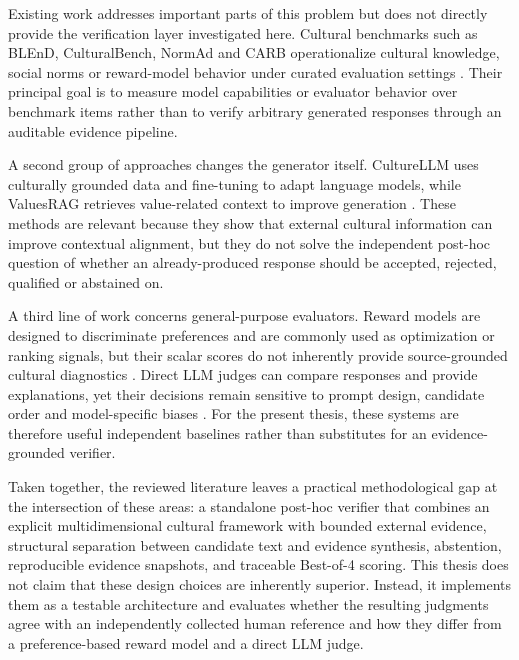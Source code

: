 Existing work addresses important parts of this problem but does not directly provide the verification layer investigated here. Cultural benchmarks such as BLEnD, CulturalBench, NormAd and CARB operationalize cultural knowledge, social norms or reward-model behavior under curated evaluation settings \parencite{myung2024blend,chiu2025culturalbench,rao2025normad,zhang2026carb}. Their principal goal is to measure model capabilities or evaluator behavior over benchmark items rather than to verify arbitrary generated responses through an auditable evidence pipeline.

A second group of approaches changes the generator itself. CultureLLM uses culturally grounded data and fine-tuning to adapt language models, while ValuesRAG retrieves value-related context to improve generation \parencite{li2024culturellm,seo2025valuesrag}. These methods are relevant because they show that external cultural information can improve contextual alignment, but they do not solve the independent post-hoc question of whether an already-produced response should be accepted, rejected, qualified or abstained on.

A third line of work concerns general-purpose evaluators. Reward models are designed to discriminate preferences and are commonly used as optimization or ranking signals, but their scalar scores do not inherently provide source-grounded cultural diagnostics \parencite{lambert2025rewardbench}. Direct LLM judges can compare responses and provide explanations, yet their decisions remain sensitive to prompt design, candidate order and model-specific biases \parencite{zheng2023llmjudge,wang2024notfairevaluators}. For the present thesis, these systems are therefore useful independent baselines rather than substitutes for an evidence-grounded verifier.

Taken together, the reviewed literature leaves a practical methodological gap at the intersection of these areas: a standalone post-hoc verifier that combines an explicit multidimensional cultural framework with bounded external evidence, structural separation between candidate text and evidence synthesis, abstention, reproducible evidence snapshots, and traceable Best-of-4 scoring. This thesis does not claim that these design choices are inherently superior. Instead, it implements them as a testable architecture and evaluates whether the resulting judgments agree with an independently collected human reference and how they differ from a preference-based reward model and a direct LLM judge.

